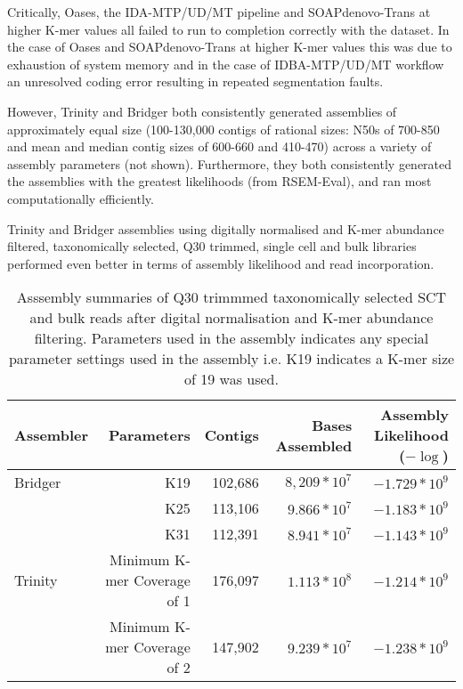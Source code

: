 Critically, Oases, the IDA-MTP/UD/MT pipeline and SOAPdenovo-Trans at higher K-mer values
all failed to run to completion correctly with the dataset.  In the case of Oases
and SOAPdenovo-Trans at higher K-mer values this was due to exhaustion
of system memory and in the case of IDBA-MTP/UD/MT workflow an unresolved coding error 
resulting in repeated segmentation faults.

However, Trinity and Bridger both consistently generated assemblies of approximately
equal size (100-130,000 contigs of rational sizes: N50s of 700-850
    and mean and median contig sizes of 600-660 and 410-470) across a variety 
    of assembly parameters (not shown).  Furthermore, they both consistently
    generated the assemblies with the greatest likelihoods (from RSEM-Eval), 
    and ran most computationally efficiently. 


Trinity and Bridger assemblies using digitally normalised and K-mer abundance 
filtered, taxonomically selected, Q30 trimmed, single cell and bulk libraries performed 
even better in terms of assembly likelihood and read incorporation.

\begin{table}[h]
    \begin{tabular}{|l|r| r| r| r|}
    	\hline
        \textbf{Assembler} & \textbf{Parameters} & \textbf{Contigs} & \textbf{Bases Assembled} & \textbf{Assembly Likelihood (\(-\log\))} \\
        \hline
        Bridger & K19 & 102,686 & \(8,209*10^{7}\)  & \(-1.729*10^{9}\) \\
                & K25 & 113,106 & \(9.866*10^{7}\)  & \(-1.183*10^{9} \) \\ 
                & K31 & 112,391 & \(8.941*10^{7}\)  & \(-1.143*10^9\) \\ 
        Trinity & Minimum K-mer Coverage of 1 & 176,097 &  \(1.113*10^{8}\)& \(-1.214*10^{9}\) \\  
                & Minimum K-mer Coverage of 2 & 147,902 & \(9.239*10^{7}\) & \(-1.238*10^9\) \\  
                \hline
    \end{tabular}
    \caption{Asssembly summaries of Q30 trimmmed taxonomically selected SCT and bulk reads 
    after digital normalisation and K-mer abundance filtering. Parameters used in the assembly
indicates any special parameter settings used in the assembly i.e. K19 indicates a K-mer size of 19 was used.
}
    \label{tab:digassemby}
\end{table}

